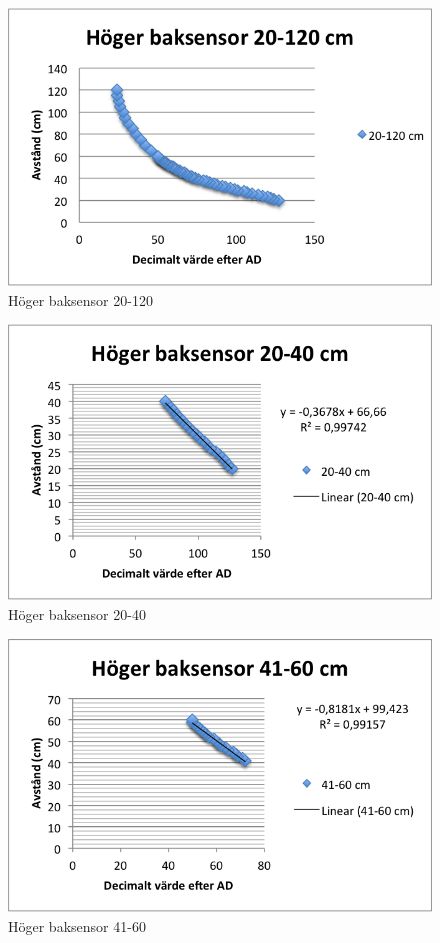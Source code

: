 \begin{figure}[H]
  \centering
 \includegraphics[angle=0,scale=1]{bilder/HB_20_120.png}
  \caption{Höger baksensor 20-120}
\end{figure}

\begin{figure}[H]
  \centering
 \includegraphics[angle=0,scale=1]{bilder/HB_20_40.png}
  \caption{Höger baksensor 20-40}
\end{figure}

\begin{figure}[H]
  \centering
 \includegraphics[angle=0,scale=1]{bilder/HB_41_60.png}
  \caption{Höger baksensor 41-60}
\end{figure}

